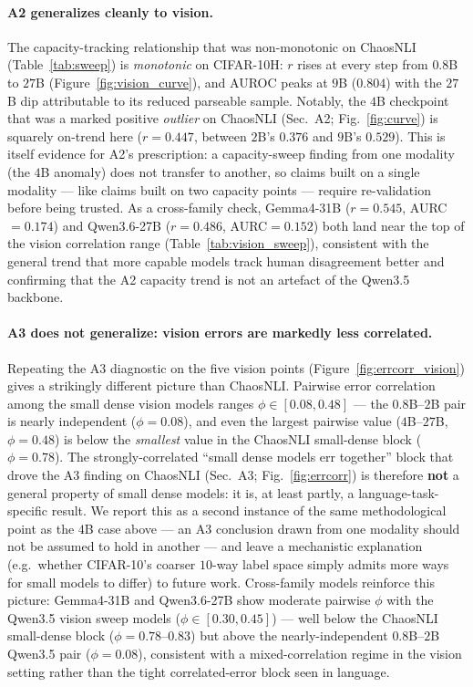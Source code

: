 \documentclass[letterpaper]{article} %
\begin{document}
\paragraph{A2 generalizes cleanly to vision.} The capacity-tracking relationship
that was non-monotonic on ChaosNLI (Table~\ref{tab:sweep}) is \emph{monotonic} on
CIFAR-10H: $r$ rises at every step from $0.8$B to $27$B
(Figure~\ref{fig:vision_curve}), and AUROC peaks at $9$B ($0.804$) with the $27$B
dip attributable to its reduced parseable sample. Notably, the $4$B checkpoint that
was a marked positive \emph{outlier} on ChaosNLI (Sec.~A2; Fig.~\ref{fig:curve}) is
squarely on-trend here ($r{=}0.447$, between $2$B's $0.376$ and $9$B's $0.529$).
This is itself evidence for A2's prescription: a capacity-sweep finding from one
modality (the $4$B anomaly) does not transfer to another, so claims built on a
single modality --- like claims built on two capacity points --- require
re-validation before being trusted.
As a cross-family check, Gemma4-31B ($r{=}0.545$, AURC$=0.174$) and
Qwen3.6-27B ($r{=}0.486$, AURC$=0.152$) both land near the top of the
vision correlation range (Table~\ref{tab:vision_sweep}), consistent with
the general trend that more capable models track human disagreement better
and confirming that the A2 capacity trend is not an artefact of the Qwen3.5
backbone.

\paragraph{A3 does not generalize: vision errors are markedly less correlated.}
Repeating the A3 diagnostic on the five vision points (Figure~\ref{fig:errcorr_vision})
gives a strikingly different picture than ChaosNLI. Pairwise error correlation
among the small dense vision models ranges $\phi{\in}[0.08, 0.48]$ --- the
$0.8$B--$2$B pair is nearly independent ($\phi{=}0.08$), and even the largest
pairwise value ($4$B--$27$B, $\phi{=}0.48$) is below the \emph{smallest} value in
the ChaosNLI small-dense block ($\phi{=}0.78$). The strongly-correlated
``small dense models err together'' block that drove the A3 finding on ChaosNLI
(Sec.~A3; Fig.~\ref{fig:errcorr}) is therefore \textbf{not} a general property of
small dense models: it is, at least partly, a language-task-specific result. We
report this as a second instance of the same methodological point as the $4$B
case above --- an A3 conclusion drawn from one modality should not be assumed to
hold in another --- and leave a mechanistic explanation (e.g.\ whether CIFAR-10's
coarser $10$-way label space simply admits more ways for small models to differ)
to future work.
Cross-family models reinforce this picture: Gemma4-31B and Qwen3.6-27B show
moderate pairwise $\phi$ with the Qwen3.5 vision sweep models
($\phi{\in}[0.30, 0.45]$) --- well below the ChaosNLI small-dense block
($\phi{=}0.78$--$0.83$) but above the nearly-independent $0.8$B--$2$B
Qwen3.5 pair ($\phi{=}0.08$), consistent with a mixed-correlation regime
in the vision setting rather than the tight correlated-error block seen in
language.
\end{document}
